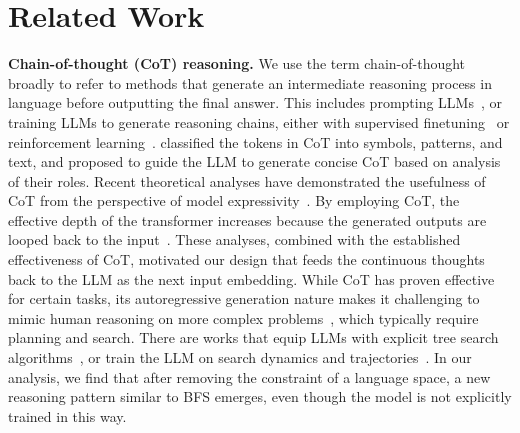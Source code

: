 \documentclass[]{fairmeta}
\begin{document}
\section{Related Work}
\label{related_work}

\noindent\textbf{Chain-of-thought (CoT) reasoning.} We use the term chain-of-thought broadly to refer to methods that generate an intermediate reasoning process in language before outputting the final answer. This includes prompting LLMs~\citep{wei2022chain, khot2022decomposed, zhou2022least}, or training LLMs to generate reasoning chains, either with supervised finetuning~\citep{yue2023mammoth, yu2023metamath} or reinforcement learning~\citep{wang2024math, havrilla2024teaching, shao2024deepseekmath, yu2024flow}. %
\citet{madaan2022text} classified the tokens in CoT into symbols, patterns, and text, and proposed to guide the LLM to generate concise CoT based on analysis of their roles. Recent theoretical analyses have demonstrated the usefulness of CoT from the perspective of model expressivity~\citep{feng2023towards, merrill2023expresssive, li2024chain}. By employing CoT, the effective depth of the transformer increases because the generated outputs are looped back to the input~\citep{feng2023towards}. These analyses, combined with the established effectiveness of CoT, motivated our design that feeds the continuous thoughts back to the LLM as the next input embedding. %
While CoT has proven effective for certain tasks, its autoregressive generation nature makes it challenging to mimic human reasoning on more complex problems~\citep{lecun2022path, hao2023reasoning}, which typically require planning and search. There are works that equip LLMs with explicit tree search algorithms~\citep{ xie2023self, yao2023tree, hao2024llm}, or train the LLM on search dynamics and trajectories~\citep{lehnert2024beyond, gandhi2024stream, su2024dualformer}. In our analysis, we find that after removing the constraint of a language space, a new reasoning pattern similar to BFS emerges, even though the model is not explicitly trained in this way.
\end{document}
